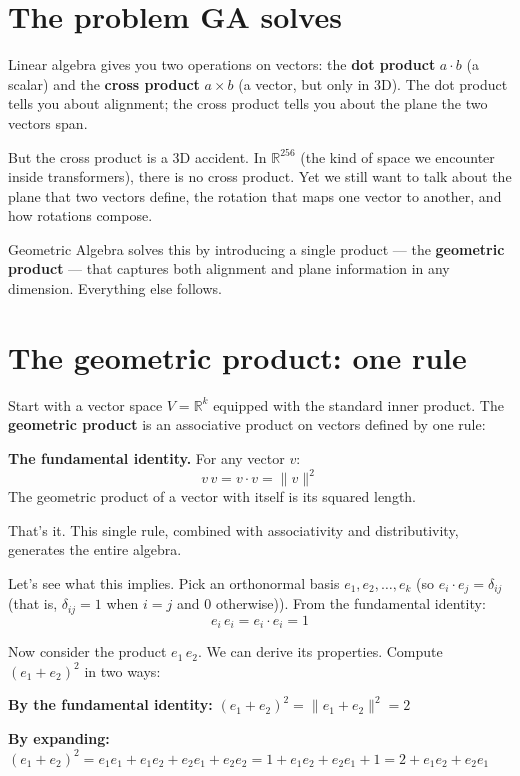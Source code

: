 \documentclass[11pt, twoside, openright]{memoir}
\newcommand{\ip}{\cdot}           %
\begin{document}
\section{The problem GA solves}

Linear algebra gives you two operations on vectors: the \textbf{dot
product} $a \ip b$ (a scalar) and the \textbf{cross product}
$a \times b$ (a vector, but only in 3D).  The dot product tells you
about alignment; the cross product tells you about the plane the two
vectors span.

But the cross product is a 3D accident.  In $\mathbb{R}^{256}$ (the
kind of space we encounter inside transformers), there is no cross
product.  Yet we still want to talk about the plane that two vectors
define, the rotation that maps one vector to another, and how
rotations compose.

Geometric Algebra solves this by introducing a single product --- the
\textbf{geometric product} --- that captures both alignment and plane
information in any dimension.  Everything else follows.

\section{The geometric product: one rule}

Start with a vector space $V = \mathbb{R}^k$ equipped with the
standard inner product.  The \textbf{geometric product} is an
associative product on vectors defined by one rule:

\begin{gabox}
\textbf{The fundamental identity.}  For any vector $v$:
\[
  v \, v = v \ip v = \|v\|^2
\]
The geometric product of a vector with itself is its squared length.
\end{gabox}

That's it.  This single rule, combined with associativity and
distributivity, generates the entire algebra.

Let's see what this implies.  Pick an orthonormal basis
$e_1, e_2, \ldots, e_k$ (so $e_i \ip e_j = \delta_{ij}$ (that is, $\delta_{ij} = 1$ when $i = j$ and $0$ otherwise)).
From the fundamental identity:
\[
  e_i \, e_i = e_i \ip e_i = 1
\]

Now consider the product $e_1 \, e_2$.  We can derive its properties.
Compute $(e_1 + e_2)^2$ in two ways:

\textbf{By the fundamental identity:}
$(e_1 + e_2)^2 = \|e_1 + e_2\|^2 = 2$

\textbf{By expanding:}
$(e_1 + e_2)^2 = e_1 e_1 + e_1 e_2 + e_2 e_1 + e_2 e_2
= 1 + e_1 e_2 + e_2 e_1 + 1 = 2 + e_1 e_2 + e_2 e_1$
\end{document}
